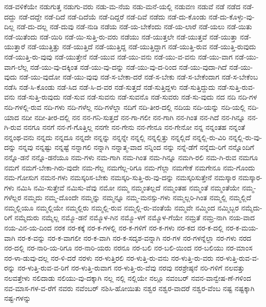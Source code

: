 {ನಡ-ವಳಿಕೆಯೇ
ನಡುಗುತ್ತ
ನಡುಗು-ವರು
ನಡು-ಮ-ನೆಯ
ನಡು-ಮನೆ-ಯಲ್ಲಿ
ನಡುವಣ
ನಡುವೆ
ನಡೆ
ನಡೆದ
ನಡೆ-ದದ್ದು
ನಡೆ-ದದ್ದೇ
ನಡೆ-ದಿದೆ
ನಡೆ-ದಿದೆಯೆ
ನಡೆ-ದಿದ್ದರೆ
ನಡೆ-ದಿವೆ
ನಡೆದು
ನಡೆ-ದು-ಕೊಂಡು
ನಡೆ-ದು-ಕೊಳ್ಳು-ವು-ದಿಲ್ಲ
ನಡೆ-ದು-ದಲ್ಲ
ನಡೆ-ದುವು
ನಡೆ-ನುಡಿ
ನಡೆಯ
ನಡೆ-ಯ-ಬೇಕೆಂದು
ನಡೆ-ಯ-ಲಾರೆ
ನಡೆ-ಯಲು
ನಡೆ-ಯಿತು
ನಡೆ-ಯಿತೆಂದು
ನಡೆ-ಯಿರಿ
ನಡೆ-ಯಿ-ಸುತ್ತಿ-ರು-ವರು
ನಡೆಯು
ನಡೆ-ಯುತ್ತಲೇ
ನಡೆ-ಯುತ್ತವೆ
ನಡೆ-ಯುತ್ತಾ
ನಡೆ-ಯುತ್ತಾರೆ
ನಡೆ-ಯುತ್ತಿತ್ತು
ನಡೆ-ಯುತ್ತಿದೆ
ನಡೆ-ಯುತ್ತಿದ್ದ
ನಡೆ-ಯುತ್ತಿದ್ದಾಗ
ನಡೆ-ಯುತ್ತಿ-ರುವ
ನಡೆ-ಯುತ್ತಿ-ರುವುದು
ನಡೆ-ಯುತ್ತಿ-ರು-ವುವು
ನಡೆ-ಯುತ್ತೇನೆ
ನಡೆ-ಯುವ
ನಡೆ-ಯು-ವನು
ನಡೆ-ಯು-ವ-ವನು
ನಡೆ-ಯು-ವಾಗ
ನಡೆ-ಯು-ವಾಗ-ಲೆಲ್ಲ
ನಡೆ-ಯು-ವು-ದಕ್ಕಿಂತ
ನಡೆ-ಯು-ವು-ದನ್ನು
ನಡೆ-ಯು-ವು-ದ-ರಿಂದ
ನಡೆ-ಯು-ವುದಾ-ಗಿದೆ
ನಡೆ-ಯು-ವುದು
ನಡೆ-ಯು-ವುದೋ
ನಡೆ-ಯು-ವುವು
ನಡೆ-ಸ-ಬೇಕಾ-ದರೆ
ನಡೆ-ಸ-ಬೇಕು
ನಡೆ-ಸ-ಬೇಕೆಂದಾಗ
ನಡೆ-ಸ-ಬೇಕೆಂಬ
ನಡೆಸಿ
ನಡೆ-ಸಿ-ಕೊಂಡು
ನಡೆ-ಸಿದ
ನಡೆ-ಸಿ-ದ-ವರ
ನಡೆ-ಸುತ್ತದೆ
ನಡೆ-ಸುತ್ತಿದ್ದಳು
ನಡೆ-ಸುತ್ತಿದ್ದುದು
ನಡೆ-ಸುತ್ತಿ-ರುವ-ವನು
ನಡೆ-ಸುತ್ತಿ-ರುವುದು
ನಡೆ-ಸುವ
ನಡೆ-ಸುವನು
ನಡೆ-ಸುವನೊ
ನಡೆ-ಸುವರು
ನಡೆ-ಸು-ವುದು
ನದ
ನದಿ
ನದಿ-ಗಳ
ನದಿ-ಗಳಲ್ಲಿ-ರುವ
ನದಿ-ಗಳು
ನದಿ-ಗಳೆಲ್ಲ
ನದಿ-ಗಳೆಲ್ಲಾ
ನದಿಗೆ
ನದಿ-ತೀರ-ದಲ್ಲಿ
ನದಿಯ
ನದಿ-ಯನ್ನು
ನದಿ-ಯಲ್ಲಿ
ನದಿ-ಯಾದ
ನದೀ
ನದೀ-ತೀರ-ದಲ್ಲಿ
ನನ
ನನ-ಗನಿ-ಸುತ್ತದೆ
ನನ-ಗಾ-ಗಲೀ
ನನ-ಗಾಗಿ
ನನ-ಗಿಂತ
ನನ-ಗಿದೆ
ನನ-ಗಿನ್ನೂ
ನನ-ಗಿ-ರುವ
ನನಗೂ
ನನಗೆ
ನನ-ಗೆ-ಗೊತ್ತಿಲ್ಲ
ನನಗೇ
ನನ-ಗೇನು
ನನ-ಗೇನೂ
ನನ-ಗೇನೋ
ನನ್ನ
ನನ್ನಂತಹ
ನನ್ನಂತೆ
ನನ್ನಂಥ-ವನು
ನನ್ನದು
ನನ್ನದೂ
ನನ್ನದೇ
ನನ್ನನ್ನು
ನನ್ನನ್ನೇ
ನನ್ನಲ್ಲಿ
ನನ್ನಲ್ಲಿತ್ತು
ನನ್ನಲ್ಲಿದೆ
ನನ್ನಲ್ಲಿ-ರು-ವಿರಿ
ನನ್ನಲ್ಲಿ-ರು-ವು-ದನ್ನು
ನನ್ನವು
ನನ್ನಷ್ಟು
ನನ್ನಷ್ಟೆ
ನನ್ನಾಗಲಿ
ನನ್ನಾಗಿ
ನನ್ನಾತ್ಮ-ವಾದ
ನನ್ನಿಂದ
ನನ್ನು
ನನ್ನೆ-ಡೆಗೆ
ನನ್ನೆದು-ರಿಗೆ
ನನ್ನೊಂದಿಗೆ
ನನ್ನೊ-ಡನೆ
ನನ್ನೊ-ಡನೆಯೂ
ನಮ-ಗಳು
ನಮ-ಗಾಗಿ
ನಮ-ಗಿಂತ
ನಮ-ಗಿನ್ನೂ
ನಮಗಿ-ರಲಿ
ನಮ-ಗಿ-ರುವ
ನಮಗೂ
ನಮಗೆ
ನಮಗೆ-ಬೇಕಾ-ಗಿರು-ವುದೇ
ನಮ-ಗೆಲ್ಲ
ನಮಗೆಲ್ಲ-ರಿಗೂ
ನಮ-ಗೆಲ್ಲಾ
ನಮಗೇಕೆ
ನಮಗೇನೂ
ನಮ-ಗೊಂದು
ನಮ-ಗೋಸುಗ
ನಮನ-ಗಳು
ನಮಸ್ಕರಿಸ-ಬೇಕು
ನಮಸ್ಕರಿ-ಸುತ್ತಿ-ರು-ವು-ದನ್ನು
ನಮಸ್ಕರಿಸುತ್ತೇನೆ
ನಮಸ್ಕಾರ
ನಮಸ್ಕಾರ-ಗಳು
ನಮಿಸಿ
ನಮಿ-ಸುತ್ತೇವೆ
ನಮಿಸು-ವೆವು
ನಮೋ
ನಮ್ಮ
ನಮ್ಮಂತಲ್ಲದೆ
ನಮ್ಮಂತಹ
ನಮ್ಮಂತೆ
ನಮ್ಮಂತೆಯೇ
ನಮ್ಮ-ಗಳೆಲ್ಲರ
ನಮ್ಮದು
ನಮ್ಮ-ದೊಂದೇ
ನಮ್ಮನ್ನು
ನಮ್ಮನ್ನೂ
ನಮ್ಮ-ಮನಸ್ಸು-ಗಳು
ನಮ್ಮಲ್ಲರಿ-ಗಿಂತ
ನಮ್ಮಲ್ಲಿ
ನಮ್ಮಲ್ಲಿದೆ
ನಮ್ಮಲ್ಲಿಯೂ
ನಮ್ಮಲ್ಲಿಯೇ
ನಮ್ಮಲ್ಲಿರು
ನಮ್ಮಲ್ಲಿ-ರುವ
ನಮ್ಮಲ್ಲಿ-ರು-ವಂತೆಯೆ
ನಮ್ಮವೇ
ನಮ್ಮಿಂದ
ನಮ್ಮಿಬ್ಬರ
ನಮ್ಮೆದು-ರಿಗೆ
ನಮ್ಮೆದುರು
ನಮ್ಮೆಲ್ಲ
ನಮ್ಮೊ-ಡನೆ
ನಮ್ಮೊಳ-ಗಿನ
ನಮ್ಮೊ-ಳಗೆ
ನಮ್ಮೊಳ-ಗೆಯೇ
ನಮ್ರತೆ
ನಮ್ರ-ನಾಗಿ
ನಯ-ವಾದ
ನಯ-ವಿನ-ಯ-ದಿಂದ
ನರಕ
ನರ-ಕಕ್ಕೆ
ನರ-ಕ-ಗಳಲ್ಲಿ
ನರ-ಕ-ಗಳಿಗೆ
ನರ-ಕ-ಗಳು
ನರ-ಕದ
ನರ-ಕ-ದಲ್ಲಿ
ನರ-ಕ-ಮಯ-ವಾಗಿ
ನರ-ಕ-ವನ್ನು
ನರ-ಕ-ವಾಗಲೀ
ನರ-ಕ-ವಾಗಿ
ನರ-ಕ-ಸದೃಶ-ವನ್ನಾಗಿ
ನರ-ಗಳ
ನರ-ಗಳನ್ನೆಲ್ಲಾ
ನರ-ಗಳು
ನರದ
ನರ-ದಲ್ಲಿ
ನರ-ನಾರಿ-ಯ-ರಿಗೂ
ನರ-ನಾರಿ-ಯರು
ನರನೂ
ನರ-ಬಲಿ
ನರ-ಬಲಿ-ಯಿಂದ
ನರ-ಬಲಿಯು
ನರ-ಮಾಂಸ
ನರ-ಳಾ-ಡುವು-ದಲ್ಲ
ನರ-ಳಿ-ದರೆ
ನರಳು
ನರ-ಳುತ್ತಿರಲಿ
ನರ-ಳುತ್ತಿ-ರು-ವನು
ನರ-ಳುತ್ತಿ-ರು-ವರು
ನರ-ಳುತ್ತಿ-ರುವ-ವ-ರನ್ನು
ನರ-ಳುತ್ತಿ-ರುವ-ವ-ರಿಗೆ
ನರ-ಳುತ್ತಿ-ರುವಾಗ
ನರ-ಳುತ್ತಿ-ರು-ವೆವು
ನರವು
ನರಶ್ರೇಷ್ಠನೆ
ನರಿ-ಗಳಿಗೆ
ನಲವತ್ತು
ನಲವತ್ತೇಳು
ನಲಿದಾಡು
ನಲಿಯು-ವು-ದಕ್ಕಾಗಿ
ನಲ್ಲ
ನಲ್ಲಿ
ನಲ್ಲಿಯೇ
ನಲ್ಲೂ
ನವಂಬರ್
ನವನ-ವಾನ್ವೇಷ-ಣೆ-ಗಳಿಂದ
ನವ-ಮಾಸ-ಗಳ-ವ-ರೆಗೆ
ನವರು
ನವೆಂಬರ್
ನಶಿಸಿ-ಹೋಯಿತು
ನಶ್ವರ
ನಶ್ವರ-ವಾದರೆ
ನಶ್ವರ-ವೆಂಬ
ನಷ್ಟ
ನಷ್ಟಕ್ಕಾಗಿ
ನಷ್ಟ-ಗಳನ್ನು
}

